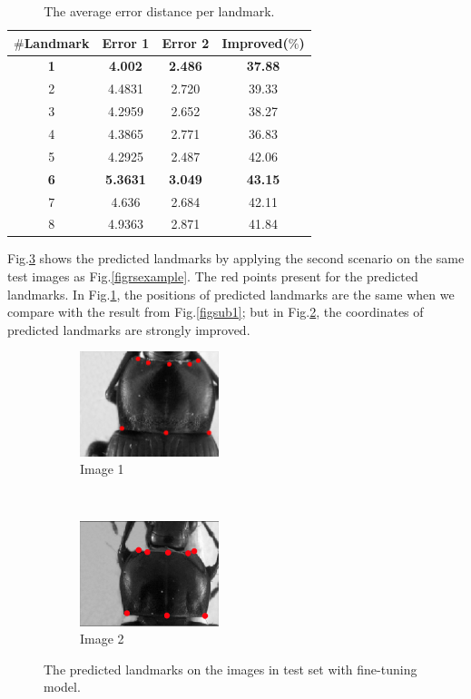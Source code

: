 \documentclass[10pt]{article}
\begin{document}
\begin{table}[htbp]
\begin{center}
\begin{tabular}{|c|c|c|c|}
\hline
\textbf{$\#$Landmark} & \textbf{Error 1} & \textbf{Error 2} & \textbf{Improved($\%$)} \\ \hline
\textbf{1} & \textbf{4.002} & \textbf{2.486} & \textbf{37.88} \\ \hline
2 & 4.4831 & 2.720 & 39.33 \\ \hline
3 & 4.2959  & 2.652 & 38.27 \\ \hline
4 & 4.3865  & 2.771 & 36.83 \\ \hline
5 & 4.2925  & 2.487 & 42.06 \\ \hline
\textbf{6} & \textbf{5.3631}  & \textbf{3.049} & \textbf{43.15} \\ \hline
7 & 4.636  & 2.684 & 42.11 \\ \hline
8 & 4.9363  & 2.871 & 41.84 \\ \hline
\end{tabular}
\caption{The average error distance per landmark.}
\label{tab2}
\end{center}
\end{table}

Fig.\ref{figrsexample2} shows the predicted landmarks by applying the second scenario on the same test images as Fig.\ref{figrsexample}. The red points present for the predicted landmarks. In Fig.\ref{figsub11}, the positions of predicted landmarks are the same when we compare with the result from Fig.\ref{figsub1}; but in Fig.\ref{figsub22}, the coordinates of predicted landmarks are strongly improved.
\begin{figure}[htbp]
    \centering
    \begin{subfigure}[t]{0.25\textwidth}
        \centering
        \includegraphics[height=1.2in]{images/fn_accuracy}
        \caption{Image 1}
        \label{figsub11}
    \end{subfigure}%
    ~ 
    \begin{subfigure}[t]{0.25\textwidth}
        \centering
        \includegraphics[height=1.2in]{images/fn_inaccuracy}
        \caption{Image 2}
        \label{figsub22}
    \end{subfigure}
    \caption{The predicted landmarks on the images in test set with fine-tuning model.}
    \label{figrsexample2}
\end{figure}
\end{document}
